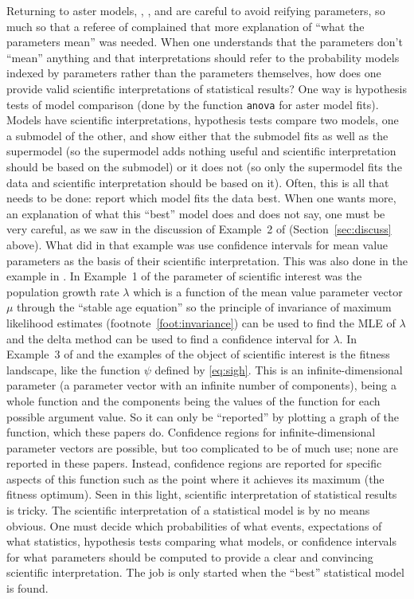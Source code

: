 \documentclass[11pt]{article}
\begin{document}
Returning to aster models, \citet{aster1}, \citet{aster2}, and \citet{aster3}
are careful to avoid reifying parameters, so much so that
a referee of \citet{aster3} complained that more explanation of ``what the
parameters mean'' was needed.  When one understands that the parameters
don't ``mean'' anything and that interpretations should refer to the
probability models indexed by parameters rather than the parameters themselves,
how does one provide valid scientific interpretations of statistical results?
One way is hypothesis tests of model comparison (done by the function
\texttt{anova} for aster model fits).  Models have scientific interpretations,
hypothesis tests compare two models, one a submodel of the other, and show
either that the submodel fits as well as the supermodel (so the supermodel
adds nothing useful and scientific interpretation should be based on the
submodel) or it does not (so only the supermodel fits the data and scientific
interpretation should be based on it).  Often, this is all that needs to be
done: report which model fits the data best.  When one wants more, an
explanation of what this ``best'' model does and does not say, one must
be very careful, as we saw in the discussion of Example~2 of \citet{aster2}
(Section~\ref{sec:discuss} above).  What \citet{aster2} did in that example
was use confidence intervals for mean value parameters as the basis of
their scientific interpretation.  This was also done in the example in
\citet{aster1}.  In Example~1 of \citet{aster2} the parameter of scientific
interest was the population growth rate $\lambda$ which is a function of
the mean value parameter vector $\mu$ through the ``stable age equation''
so the principle of invariance of maximum likelihood estimates
(footnote~\ref{foot:invariance}) can be used to find the MLE of $\lambda$
and the delta method can be used to find a confidence interval for $\lambda$.
In Example~3 of \citet{aster2} and the examples of \citet{aster3} the object
of scientific interest is the fitness landscape, like the function $\psi$
defined by \eqref{eq:sigh}.  This is an infinite-dimensional parameter
(a parameter vector with an infinite number of components),
being a whole function and the components
being the values of the function for each possible argument value.
So it can
only be ``reported'' by plotting a graph of the function, which these papers
do.  Confidence regions for infinite-dimensional parameter vectors are
possible, but too complicated to be of much use; none are reported in these
papers.  Instead, confidence regions are reported for specific aspects of
this function such as the point where it achieves its maximum (the fitness
optimum).  Seen in this light, scientific interpretation of
statistical results is tricky.  The scientific interpretation of a statistical
model is by no means obvious.  One must decide which probabilities of what
events,
expectations of what statistics, hypothesis tests comparing what models,
or confidence intervals for what parameters should be computed to provide
a clear and convincing scientific interpretation.  The job is only started
when the ``best'' statistical model is found.
\end{document}

